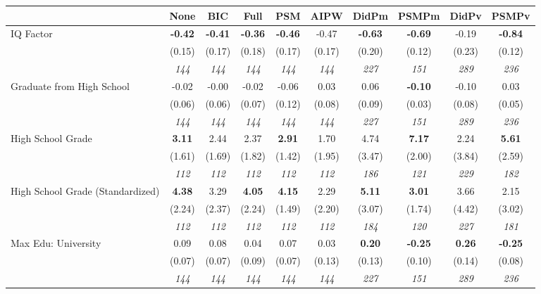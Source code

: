 \begin{tabular}{l c c c c c c c c c}
\toprule
 & None & BIC & Full & PSM & AIPW & DidPm & PSMPm & DidPv & PSMPv \\
\midrule
IQ Factor & \textbf{ -0.42 } & \textbf{ -0.41 } & \textbf{ -0.36 } & \textbf{-0.46} & -0.47 & \textbf{ -0.63 } & \textbf{-0.69} & -0.19 & \textbf{-0.84} \\
& (0.15) & (0.17) & (0.18) & (0.17) & (0.17) & (0.20) & (0.12) & (0.23) & (0.12) \\
& \textit{ 144 } & \textit{ 144 } & \textit{ 144 } & \textit{ 144 } & \textit{ 144 } & \textit{ 227 } & \textit{ 151 } & \textit{ 289 } & \textit{ 236 } \\
Graduate from High School & -0.02 & -0.00 & -0.02 & -0.06 & 0.03 & 0.06 & \textbf{-0.10} & -0.10 & 0.03 \\
& (0.06) & (0.06) & (0.07) & (0.12) & (0.08) & (0.09) & (0.03) & (0.08) & (0.05) \\
& \textit{ 144 } & \textit{ 144 } & \textit{ 144 } & \textit{ 144 } & \textit{ 144 } & \textit{ 227 } & \textit{ 151 } & \textit{ 289 } & \textit{ 236 } \\
High School Grade & \textbf{ 3.11 } & 2.44 & 2.37 & \textbf{2.91} & 1.70 & 4.74 & \textbf{7.17} & 2.24 & \textbf{5.61} \\
& (1.61) & (1.69) & (1.82) & (1.42) & (1.95) & (3.47) & (2.00) & (3.84) & (2.59) \\
& \textit{ 112 } & \textit{ 112 } & \textit{ 112 } & \textit{ 112 } & \textit{ 112 } & \textit{ 186 } & \textit{ 121 } & \textit{ 229 } & \textit{ 182 } \\
High School Grade (Standardized) & \textbf{ 4.38 } & 3.29 & \textbf{ 4.05 } & \textbf{4.15} & 2.29 & \textbf{ 5.11 } & \textbf{3.01} & 3.66 & 2.15 \\
& (2.24) & (2.37) & (2.24) & (1.49) & (2.20) & (3.07) & (1.74) & (4.42) & (3.02) \\
& \textit{ 112 } & \textit{ 112 } & \textit{ 112 } & \textit{ 112 } & \textit{ 112 } & \textit{ 184 } & \textit{ 120 } & \textit{ 227 } & \textit{ 181 } \\
Max Edu: University & 0.09 & 0.08 & 0.04 & 0.07 & 0.03 & \textbf{ 0.20 } & \textbf{-0.25} & \textbf{ 0.26 } & \textbf{-0.25} \\
& (0.07) & (0.07) & (0.09) & (0.07) & (0.13) & (0.13) & (0.10) & (0.14) & (0.08) \\
& \textit{ 144 } & \textit{ 144 } & \textit{ 144 } & \textit{ 144 } & \textit{ 144 } & \textit{ 227 } & \textit{ 151 } & \textit{ 289 } & \textit{ 236 } \\

\end{tabular}
